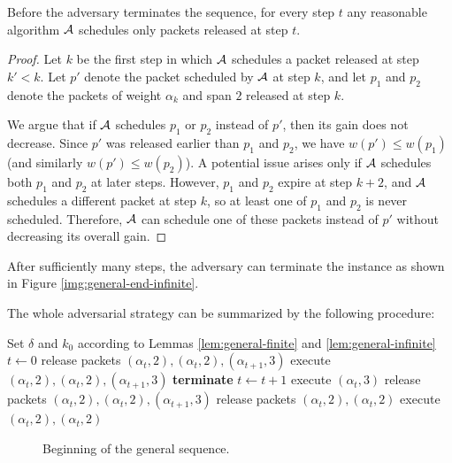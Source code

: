 \begin{lemma}\label{lem:alg-behaviour}
Before the adversary terminates the sequence, for every step $t$ any reasonable
algorithm $\mathcal{A}$ schedules only packets released at step $t$.
\end{lemma}
\begin{proof}
Let $k$ be the first step in which $\mathcal{A}$ schedules a packet released at step
$k' < k$. Let $p'$ denote the packet scheduled by $\mathcal{A}$ at step $k$, and let
$p_1$ and $p_2$ denote the packets of weight $\alpha_k$ and span $2$ released at
step $k$.

We argue that if $\mathcal{A}$ schedules $p_1$ or $p_2$ instead of $p'$, then its gain
does not decrease. Since $p'$ was released earlier than $p_1$ and $p_2$, we have
$w(p') \leq w(p_1)$ (and similarly $w(p') \leq w(p_2)$). A potential issue arises
only if $\mathcal{A}$ schedules both $p_1$ and $p_2$ at later steps. However, $p_1$ and
$p_2$ expire at step $k + 2$, and $\mathcal{A}$ schedules a different packet at step $k$,
so at least one of $p_1$ and $p_2$ is never scheduled. Therefore, $\mathcal{A}$ can
schedule one of these packets instead of $p'$ without decreasing its overall
gain.
\end{proof}

After sufficiently many steps, the adversary can terminate the instance as shown in Figure
\ref{img:general-end-infinite}.

The whole adversarial strategy can be summarized by the following procedure:

\begin{algorithmic}[1]
\State Set $\delta$ and $k_0$ according to Lemmas \ref{lem:general-finite} and \ref{lem:general-infinite}
\State $t \gets 0$
\State release packets $(\alpha_t, 2), (\alpha_t, 2), (\alpha_{t+1}, 3)$
    \State execute $(\alpha_{t}, 2), (\alpha_{t}, 2), (\alpha_{t+1}, 3)$
    \State \textbf{terminate}
\EndIf
\State $t \gets t + 1$
\State execute $(\alpha_{t}, 3)$
\State release packets $(\alpha_t, 2), (\alpha_t, 2), (\alpha_{t+1}, 3)$
\EndWhile
\State release packets $(\alpha_t, 2), (\alpha_t, 2)$
\State execute $(\alpha_{t}, 2), (\alpha_{t}, 2)$
\end{algorithmic}

\begin{figure}[ht]\centering
{}
\caption{Beginning of the general sequence.}
\label{img:general-start}
\end{figure}

